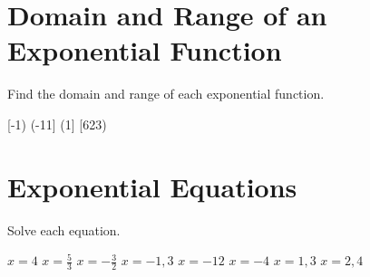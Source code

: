 \section*{Domain and Range of an Exponential Function}
Find the domain and range of each exponential function.
\begin{smenum}
\mitemxxxx
{[-1)}
{(-11]}
{(1]}
{[623)}
\end{smenum}

\section*{Exponential Equations}
Solve each equation.
\begin{smenum}
\mitemxxxx
{$x=4$}
{$x=\frac{5}{3}$}
{$x=-\frac{3}{2}$}
{$x=-1,3$}
\mitemxxxx
{$x=-12$}
{$x=-4$}
{$x=1,3$}
{$x=2,4$}
\end{smenum}

